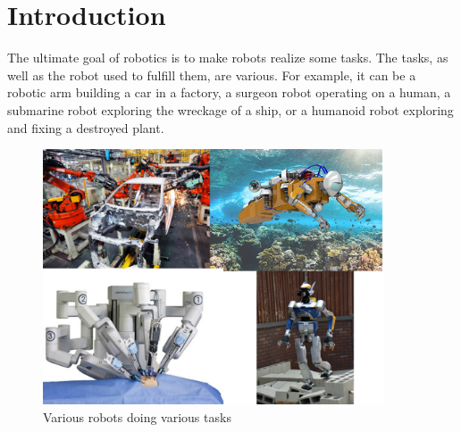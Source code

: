 

\chapter*{Introduction}
\label{cha:introduction}

\graphicspath{{Chapter0-Introduction/Figs/Vector/}{Chapter0-Introduction/Figs/}}

The ultimate goal of robotics is to make robots realize some tasks.
The tasks, as well as the robot used to fulfill them, are various.
For example, it can be a robotic arm building a car in a factory, a surgeon robot operating on a human, a submarine robot exploring the wreckage of a ship, or a humanoid robot exploring and fixing a destroyed plant.

\begin{figure}[ht]
  \centering
  \includegraphics[width=0.9\textwidth]{various-tasks.png}
  \caption{Various robots doing various tasks}
\label{fig:various}
\end{figure}

